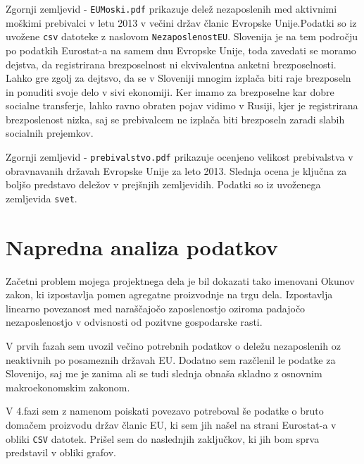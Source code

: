 \documentclass[11pt,a4paper]{article}
\begin{document}
Zgornji zemljevid - \verb|EUMoski.pdf| prikazuje delež nezaposlenih med aktivnimi moškimi prebivalci v letu 2013 v večini držav članic Evropske Unije.Podatki so iz uvožene \verb|csv| datoteke z naslovom \verb|NezaposlenostEU|. Slovenija je na tem področju po podatkih Eurostat-a na samem dnu Evropske Unije, toda zavedati se moramo dejstva, da registrirana brezposelnost ni ekvivalentna anketni brezposelnosti. Lahko gre zgolj za dejtsvo, da se v Sloveniji mnogim izplača biti raje brezposeln in ponuditi svoje delo v sivi ekonomiji. Ker imamo za brezposelne kar dobre socialne transferje, lahko ravno obraten pojav vidimo v Rusiji, kjer je registrirana brezposlenost nizka, saj se prebivalcem ne izplača biti brezposeln zaradi slabih socialnih prejemkov.


Zgornji zemljevid - \verb|prebivalstvo.pdf| prikazuje ocenjeno velikost prebivalstva v obravnavanih državah Evropske Unije za leto 2013. Slednja ocena je ključna za boljšo predstavo deležov v prejšnjih zemljevidih. Podatki so iz uvoženega zemljevida \verb|svet|. 

\pagebreak
\section{Napredna analiza podatkov}

Začetni problem mojega projektnega dela je bil dokazati tako imenovani Okunov zakon, ki izpostavlja pomen agregatne proizvodnje na trgu dela. Izpostavlja linearno povezanost med naraščajočo zaposlenostjo oziroma padajočo nezaposlenostjo v odvisnosti od pozitvne gospodarske rasti. 

V prvih fazah sem uvozil večino potrebnih podatkov o deležu nezaposlenih oz neaktivnih po posameznih državah EU. Dodatno sem razčlenil le podatke za Slovenijo, saj me je zanima ali se tudi slednja obnaša skladno z osnovnim makroekonomskim zakonom.

V 4.fazi sem z namenom poiskati povezavo potreboval še podatke o bruto domačem proizvodu držav članic EU, ki sem jih našel na strani Eurostat-a v obliki \verb|CSV| datotek. Prišel sem do naslednjih zaključkov, ki jih bom sprva predstavil v obliki grafov.
\end{document}
